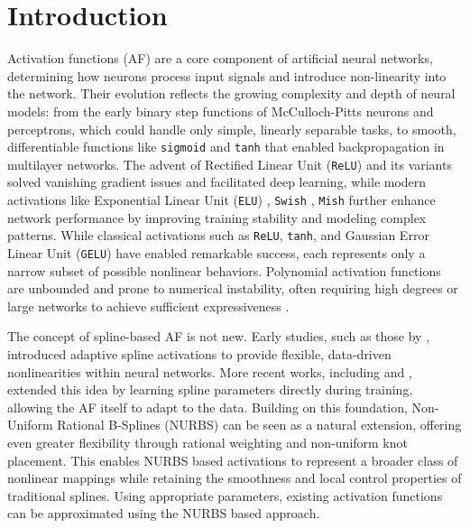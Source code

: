 \documentclass[11pt]{article}
\begin{document}
\section{Introduction}
Activation functions (AF) are a core component of artificial neural networks, determining how neurons process input 
signals and introduce non-linearity into the network. Their evolution reflects the growing complexity 
and depth of neural models: from the early binary step functions of McCulloch-Pitts \cite{mcculloch1943logical}
neurons and perceptrons, 
which could handle only simple, linearly separable tasks, to smooth, differentiable functions like \texttt{sigmoid} \cite{MINAI1993845}
and \texttt{tanh} \cite{6795724} that enabled backpropagation in multilayer networks. The advent of Rectified Linear Unit (\texttt{ReLU}) \cite{relu} and its variants solved 
vanishing gradient issues and facilitated deep learning, while modern activations like Exponential Linear Unit (\texttt{ELU}) \cite{clevert2016fastaccuratedeepnetwork}, 
\texttt{Swish} \cite{ramachandran2017searchingactivationfunctions}, 
\texttt{Mish} \cite{misra2020mishselfregularizednonmonotonic} 
further enhance network performance by improving training stability and modeling complex patterns.
While classical activations such as \texttt{ReLU}, \texttt{tanh}, and Gaussian Error Linear Unit (\texttt{GELU}) \cite{hendrycks2023gaussianerrorlinearunits}
have enabled remarkable success, each represents only a narrow subset of possible nonlinear behaviors. 
Polynomial activation functions are unbounded and prone to numerical instability, 
often requiring high degrees or large networks to achieve sufficient expressiveness \cite{Hornik1989Multilayer}
\cite{Leshno1993NonPolynomial} \cite{Goodfellow2016DeepLearning}.

The concept of spline-based AF is not new. Early studies, such as those by 
\cite{guarnieri1999multilayer}, introduced adaptive spline activations to provide flexible, 
data-driven nonlinearities within neural networks. 
More recent works, including \cite{hryniowski2018polyneuronautomaticneurondiscovery} and 
\cite{bohra2020learning}, extended this idea by learning spline parameters directly during training, 
allowing the AF itself to adapt to the data. 
Building on this foundation, Non-Uniform Rational B-Splines (NURBS) can be seen as a natural 
extension, offering even greater flexibility through rational weighting and non-uniform knot placement. 
This enables NURBS based activations to represent a broader class of nonlinear mappings while 
retaining the smoothness and local control properties of traditional splines.
Using appropriate parameters, existing activation functions can be approximated using the NURBS based approach.
\end{document}
